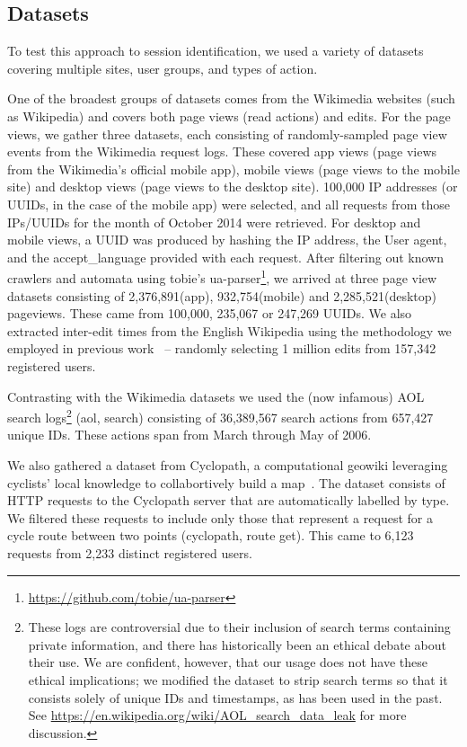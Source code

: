 \subsection{Datasets}
To test this approach to session identification, we used a variety of datasets covering multiple sites, user groups, and types of action.

 One of the broadest groups of datasets comes from the Wikimedia websites (such as Wikipedia) and covers both page views (read actions) and edits. For the page views, we gather three datasets, each consisting of randomly-sampled page view events from the Wikimedia request logs. These covered app views (page views from the Wikimedia's official mobile app), mobile views (page views to the mobile site) and desktop views (page views to the desktop site). 100,000 IP addresses (or UUIDs, in the case of the mobile app) were selected, and all requests from those IPs/UUIDs for the month of October 2014 were retrieved. For desktop and mobile views, a UUID was produced by hashing the IP address, the User agent, and the accept\_language provided with each request. After filtering out known crawlers and automata using tobie's ua-parser\footnote{\url{https://github.com/tobie/ua-parser}}, we arrived at three page view datasets consisting of 2,376,891(app), 932,754(mobile) and 2,285,521(desktop) pageviews. These came from 100,000, 235,067 or 247,269 UUIDs. We also extracted inter-edit times from the English Wikipedia using the methodology we employed in previous work~\cite{geiger2013using} -- randomly selecting 1 million edits from 157,342 registered users.


 Contrasting with the Wikimedia datasets we used the (now infamous) AOL search logs\footnote{These logs are controversial due to their inclusion of search terms containing private information, and there has historically been an ethical debate about their use. We are confident, however, that our usage does not have these ethical implications; we modified the dataset to strip search terms so that it consists solely of unique IDs and timestamps, as has been used in the past.\cite{mehrzadi2012onextracting}  See \url{https://en.wikipedia.org/wiki/AOL_search_data_leak} for more discussion.} (aol, search) consisting of 36,389,567 search actions from 657,427 unique IDs. These actions span from March through May of 2006.

 We also gathered a dataset from Cyclopath, a computational geowiki leveraging cyclists' local knowledge to collabortively build a map~\cite{priedhorsky2008computational}.  The dataset consists of HTTP requests to the Cyclopath server that are automatically labelled by type.  We filtered these requests to include only those that represent a request for a cycle route between two points (cyclopath, route get). This came to 6,123 requests from 2,233 distinct registered users.

